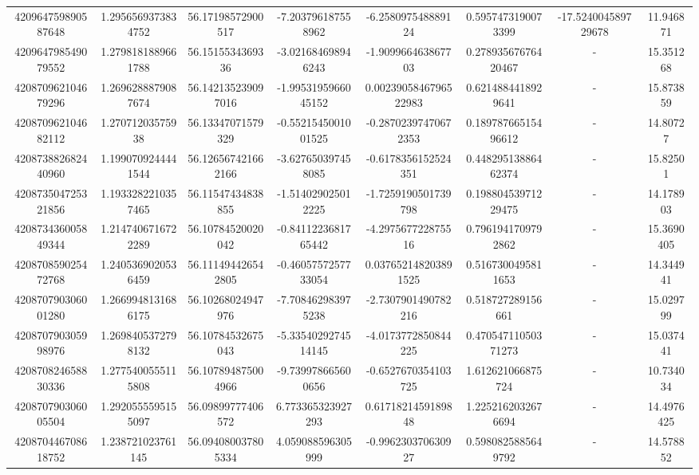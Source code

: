 \documentclass{article}
\begin{document}
\begin{landscape}
\begin{longtable}[c]{S[table-format=18.0]S[table-format=2.15]S[table-format=2.15]S[table-format=-2.17]S[table-format=-2.16]S[table-format=-2.16]S[table-format=-3.16]S[table-format=2.7]}
420964759890587648 & 1.2956569373834752 & 56.17198572900517  & -7.203796187558962   & -6.258097548889124     & 0.5957473190073399  & -17.524004589729678 & 11.946871  \\
420964798549079552 & 1.2798181889661788 & 56.1515534369336   & -3.021684698946243   & -1.909966463867703     & 0.27893567676420467 & {-}                  & 15.351268  \\
420870962104679296 & 1.2696288879087674 & 56.142135239097016 & -1.9953195966045152  & 0.0023905846796522983  & 0.6214884418929641  & {-}                  & 15.873859  \\
420870962104682112 & 1.27071203575938   & 56.13347071579329  & -0.5521545001001525  & -0.28702397470672353   & 0.18978766515496612 & {-}                  & 14.80727   \\
420873882682440960 & 1.1990709244441544 & 56.126567421662166 & -3.627650397458085   & -0.6178356152524351    & 0.44829513886462374 & {-}                  & 15.82501   \\
420873504725321856 & 1.1933282210357465 & 56.11547434838855  & -1.514029025012225   & -1.7259190501739798    & 0.19880453971229475 & {-}                  & 14.178903  \\
420873436005849344 & 1.2147406716722289 & 56.10784520020042  & -0.8411223681765442  & -4.297567722875516     & 0.7961941709792862  & {-}                  & 15.3690405 \\
420870859025472768 & 1.2405369020536459 & 56.111494426542805 & -0.4605757257733054  & 0.037652148203891525   & 0.5167300495811653  & {-}                  & 14.344941  \\
420870790306001280 & 1.2669948131686175 & 56.10268024947976  & -7.708462983975238   & -2.7307901490782216    & 0.518727289156661   & {-}                  & 15.029799  \\
420870790305998976 & 1.2698405372798132 & 56.10784532675043  & -5.3354029274514145  & -4.0173772850844225    & 0.47054711050371273 & {-}                  & 15.037441  \\
420870824658830336 & 1.2775400555115808 & 56.107894875004966 & -9.739978665600656   & -0.6527670354103725    & 1.612621066875724   & {-}                  & 10.734034  \\
420870790306005504 & 1.2920555595155097 & 56.09899777406572  & 6.773365323927293    & 0.6171821459189848     & 1.2252162032676694  & {-}                  & 14.4976425 \\
420870446708618752 & 1.238721023761145  & 56.094080037805334 & 4.059088596305999    & -0.996230370630927     & 0.5980825885649792  & {-}                  & 14.578852  \\

\end{longtable}
\end{landscape}
\end{document}
